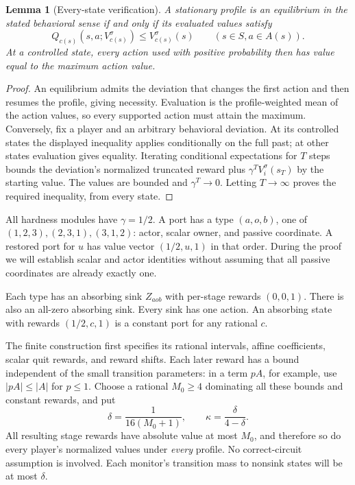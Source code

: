 \documentclass[11pt,a4paper]{article}
\numberwithin{equation}{section}
\newtheorem{lemma}[theorem]{Lemma}
\theoremstyle{definition}
\begin{document}
\begin{lemma}[Every-state verification]\label{lem:bellman}
A stationary profile is an equilibrium in the stated behavioral sense if
and only if its evaluated values satisfy
\[
 Q_{c(s)}(s,a;V_{c(s)}^\sigma)\leq V_{c(s)}^\sigma(s)
 \qquad(s\in S, a\in A(s)).
\]
At a controlled state, every action used with positive probability then
has value equal to the maximum action value.
\end{lemma}
\begin{proof}
An equilibrium admits the deviation that changes the first action and
then resumes the profile, giving necessity. Evaluation is the
profile-weighted mean of the action values, so every supported action
must attain the maximum. Conversely, fix a player and an arbitrary
behavioral deviation. At its controlled states the displayed inequality
applies conditionally on the full past; at other states evaluation gives
equality. Iterating conditional expectations for \(T\) steps bounds the
deviation's normalized truncated reward plus \(\gamma^T V_i^\sigma(s_T)\)
by the starting value. The values are bounded and \(\gamma^T\to0\).
Letting \(T\to\infty\) proves the required inequality, from every state.
\end{proof}

All hardness modules have \(\gamma=1/2\). A port has a type
\((a,o,b)\), one of \((1,2,3),(2,3,1),(3,1,2)\): actor, scalar owner,
and passive coordinate. A restored port for \(u\) has value vector
\((1/2,u,1)\) in that order. During the proof we will establish scalar
and actor identities without assuming that all passive coordinates are
already exactly one.

Each type has an absorbing sink \(Z_{aob}\) with per-stage rewards
\((0,0,1)\). There is also an all-zero absorbing sink. Every sink has
one action. An absorbing state with rewards \((1/2,c,1)\) is a constant
port for any rational \(c\).

The finite construction first specifies its rational intervals, affine
coefficients, scalar quit rewards, and reward shifts. Each later reward
has a bound independent of the small transition parameters: in a term
\(pA\), for example, use \(|pA|\leq|A|\) for \(p\leq1\).
Choose a rational \(M_0\geq4\) dominating all these bounds and constant
rewards, and put
\begin{equation}\label{eq:delta}
 \delta=\frac1{16(M_0+1)},\qquad
 \kappa=\frac{\delta}{4-\delta}.
\end{equation}
All resulting stage rewards have absolute value at most \(M_0\), and
therefore so do every player's normalized values under \emph{every}
profile. No correct-circuit assumption is involved. Each monitor's
transition mass to nonsink states will be at most \(\delta\).
\end{document}
